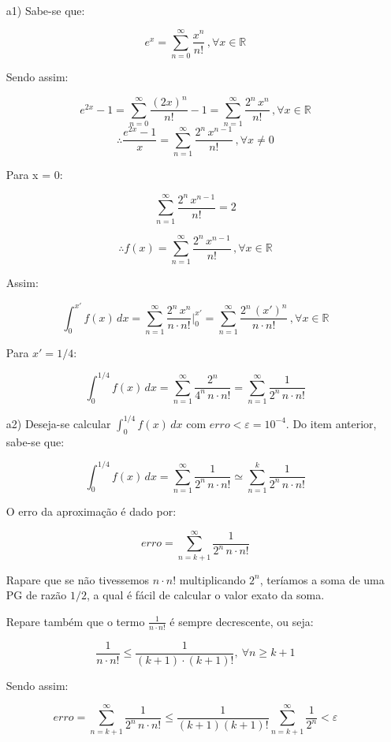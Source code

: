\documentclass[12pt,a4paper]{article}
\begin{document}
 \\

\begin{itemize}
\item[a1)] Sabe-se que:

$$ e^x  = \sum_{n=0}^\infty \frac{x^n}{n!} \, , \forall x \in \mathbb{R}$$

Sendo assim:

$$ e^{2x} - 1 = \sum_{n=0}^\infty \frac{(2x)^n}{n!} - 1 =  \sum_{n=1}^\infty \frac{2^n \, x^n}{n!} \, , \forall x \in \mathbb{R} $$
$$ \therefore \frac{e^{2x} - 1}{x} = \sum_{n=1}^\infty \frac{2^n \, x^{n-1}}{n!} \, , \forall x \neq 0 $$

Para x = 0:

$$ \sum_{n=1}^\infty \frac{2^n \, x^{n-1}}{n!} = 2 $$

$$ \therefore f(x) = \sum_{n=1}^\infty \frac{2^n \, x^{n-1}}{n!} \, , \forall x \in \mathbb{R} $$

Assim:

$$ \int_{0}^{x'} f(x) \, dx = \sum_{n=1}^\infty \frac{2^n \, x^{n}}{n \cdot n!} \Big|_{0}^{x'} = \sum_{n=1}^\infty \frac{2^n \, (x')^{n}}{n \cdot n!} \, , \forall x \in \mathbb{R} $$

Para $ x' = 1/4$:

$$ \int_{0}^{1/4} f(x) \, dx =  \sum_{n=1}^\infty \frac{2^n}{ 4^n \, n \cdot n!} = \sum_{n=1}^\infty \frac{1}{ 2^n \, n \cdot n!} $$

\item[a2)] Deseja-se calcular $ \displaystyle\int_{0}^{1/4} f(x) \, dx$ com $erro < \varepsilon = 10^{-4}$. Do item anterior, sabe-se que:

$$ \int_{0}^{1/4} f(x) \, dx = \sum_{n=1}^\infty \frac{1}{ 2^n \, n \cdot n!} \simeq \sum_{n=1}^k \frac{1}{ 2^n \, n \cdot n!}  $$

O erro da aproximação é dado por:

$$ erro = \sum_{n=k+1}^\infty \frac{1}{ 2^n \, n \cdot n!} $$

Rapare que se não tivessemos $ n \cdot n!$ multiplicando $2^n$, teríamos a soma de uma PG de razão $1/2$, a qual é fácil de calcular o valor exato da soma.

Repare também que o termo $ \frac{1}{n \cdot n!} $ é sempre decrescente, ou seja:

$$ \frac{1}{n \cdot n!} \leq \frac{1}{ (k+1) \cdot (k+1)!} ,\ \forall n \geq k+1 $$

Sendo assim:

$$ erro = \sum_{n=k+1}^\infty \frac{1}{ 2^n \, n \cdot n!} \leq \frac{1}{(k+1)(k+1)!} \sum_{n=k+1}^\infty \frac{1}{ 2^n} < \varepsilon $$


\end{itemize}
\end{document}
